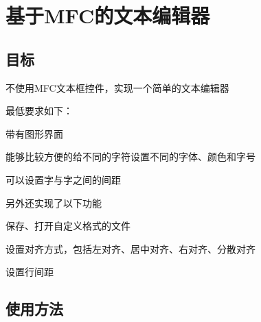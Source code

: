 \section*{基于\+M\+F\+C的文本编辑器 }

\subsection*{目标 }


\begin{DoxyEnumerate}
\item 不使用\+M\+F\+C文本框控件，实现一个简单的文本编辑器
\item 最低要求如下：
\begin{DoxyItemize}
\item 带有图形界面
\item 能够比较方便的给不同的字符设置不同的字体、颜色和字号
\item 可以设置字与字之间的间距
\end{DoxyItemize}
\item 另外还实现了以下功能
\begin{DoxyItemize}
\item 保存、打开自定义格式的文件
\item 设置对齐方式，包括左对齐、居中对齐、右对齐、分散对齐
\item 设置行间距
\end{DoxyItemize}
\end{DoxyEnumerate}

\subsection*{使用方法 }


